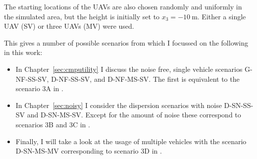 The starting locations of the UAVs are also chosen randomly and uniformly in the 
simulated area, but the height is initially set to $x_3 = \SI{-10}{\meter}$.  
Either a single UAV (SV) or three UAVs (MV) were used.

This gives a number of possible scenarios from which I focussed on the following 
in this work:
\begin{itemize}
    \item In Chapter~\ref{sec:cmputility} I discuss the noise free, single 
        vehicle scenarios G-NF-SS-SV, D-NF-SS-SV, and D-NF-MS-SV\@. The first is 
        equivalent to the scenario 3A in \textcite{denardi2013rn}.
    \item In Chapter~\ref{sec:noisy} I consider the dispersion scenarios with 
        noise D-SN-SS-SV and D-SN-MS-SV\@. Except for the amount of noise these 
        correspond to scenarios 3B and 3C in \textcite{denardi2013rn}.
    \item Finally, I will take a look at the usage of multiple vehicles with the 
        scenario D-SN-MS-MV corresponding to scenario 3D in 
        \textcite{denardi2013rn}.
\end{itemize}
